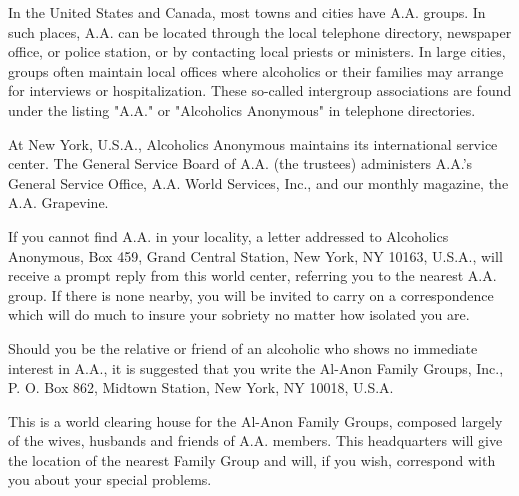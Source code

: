 

\begin{biblechapter}
    In the United States and Canada, 
    most towns and cities have A.A. groups.
\verse In such places, 
    A.A. can be located through the local telephone directory, 
    newspaper office,
    or police station, 
    or by contacting local priests or ministers.
\verse In large cities, 
    groups often maintain local offices 
    where alcoholics or their families 
    may arrange for interviews or hospitalization.
\verse These so-called intergroup associations are found under the listing 
    "A.A." or "Alcoholics Anonymous" in telephone directories.

    At New York, U.S.A., 
    Alcoholics Anonymous maintains its international service center.
\verse The General Service Board of A.A. (the trustees) 
    administers A.A.'s General Service Office, A.A. World Services, Inc., 
    and our monthly magazine, the A.A. Grapevine.

\verse If you cannot find A.A. in your locality, 
    a letter addressed to Alcoholics Anonymous, 
    Box 459, Grand Central Station, New York, NY 10163, U.S.A., 
    will receive a prompt reply from this world center, 
    referring you to the nearest A.A. group.
\verse If there is none nearby, 
    you will be invited to carry on a correspondence 
    which will do much to insure your sobriety 
    no matter how isolated you are.

    Should you be the relative or friend of an alcoholic 
    who shows no immediate interest in A.A., 
    it is suggested that you write the Al-Anon Family Groups, Inc., 
    P. O. Box 862, Midtown Station, New York, NY 10018, U.S.A.

\verse This is a world clearing house for the Al-Anon Family Groups, 
    composed largely of the wives, husbands and friends of A.A. members.
\verse This headquarters will give the location of the nearest Family Group 
    and will, if you wish, correspond with you about your special problems.
\end{biblechapter}
